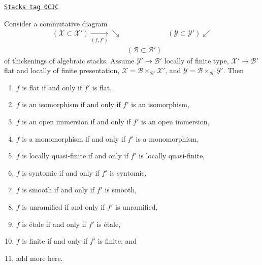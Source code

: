 \begin{lemma}
\label{stacks-more-morphisms-lemma-deform-property-fp-over-ft}
\href{https://stacks.math.columbia.edu/tag/0CJC}{\texttt{Stacks tag 0CJC}}

Consider a commutative diagram
$$
\begin{array}{ccc}(\mathcal{X} \subset \mathcal{X}') \underset{(f, f')}{\longrightarrow}\searrow &  & (\mathcal{Y} \subset \mathcal{Y}') \swarrow \\  & (\mathcal{B} \subset \mathcal{B}') & \end{array}
$$
of thickenings of algebraic stacks.
Assume $\mathcal{Y}' \to \mathcal{B}'$ locally of finite type,
$\mathcal{X}' \to \mathcal{B}'$ flat and locally of finite presentation,
$\mathcal{X} = \mathcal{B} \times_{\mathcal{B}'} \mathcal{X}'$, and
$\mathcal{Y} = \mathcal{B} \times_{\mathcal{B}'} \mathcal{Y}'$. Then
\begin{enumerate}
\item $f$ is flat if and only if $f'$ is flat,
\label{stacks-more-morphisms-item-flat-fp-over-ft}
\item $f$ is an isomorphism if and only if $f'$ is an isomorphism,
\label{stacks-more-morphisms-item-isomorphism-fp-over-ft}
\item $f$ is an open immersion if and only if $f'$ is an open immersion,
\label{stacks-more-morphisms-item-open-immersion-fp-over-ft}
\item $f$ is a monomorphism if and only if $f'$ is a monomorphism,
\label{stacks-more-morphisms-item-monomorphism-fp-over-ft}
\item $f$ is locally quasi-finite if and only if $f'$ is locally quasi-finite,
\label{stacks-more-morphisms-item-quasi-finite-fp-over-ft}
\item $f$ is syntomic if and only if $f'$ is syntomic,
\label{stacks-more-morphisms-item-syntomic-fp-over-ft}
\item $f$ is smooth if and only if $f'$ is smooth,
\label{stacks-more-morphisms-item-smooth-fp-over-ft}
\item $f$ is unramified if and only if $f'$ is unramified,
\label{stacks-more-morphisms-item-unramified-fp-over-ft}
\item $f$ is \'etale if and only if $f'$ is \'etale,
\label{stacks-more-morphisms-item-etale-fp-over-ft}
\item $f$ is finite if and only if $f'$ is finite, and
\label{stacks-more-morphisms-item-finite-fp-over-ft}
\item add more here.
\end{enumerate}
\end{lemma}

